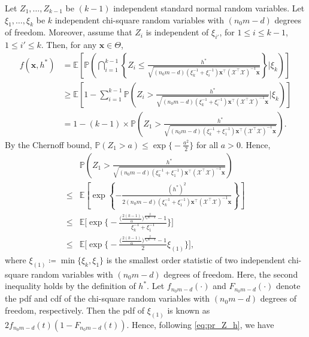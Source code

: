 \documentclass[ijoc,nonblindrev]{informs3}
\def\E{\mathbb{E}}
\def\pr{\mathbb{P}}
\def\bx{{\bm x}}
\def\cX{{\mathcal X}}
\begin{document}
Let $Z_1,\ldots,Z_{k-1}$ be $(k-1)$ independent standard normal random variables. Let $\xi_1,\ldots,\xi_k$ be $k$  independent chi-square random variables with $(n_0m-d)$ degrees of freedom.
Moreover, assume that $Z_i$ is independent of $\xi_{i'}$, for $1\leq i \leq k-1$, $1\leq i' \leq k$.
Then, for any $\bx\in\Theta$,
\begin{align}
f(\bx,h^*) &= \E \left[ \pr \left( \bigcap_{i=1}^{k-1} \left\{Z_i \leq \frac{h^*}{\sqrt{(n_0m-d) (\xi_k^{-1}+\xi_i^{-1})\bx^\intercal (\cX^\intercal \cX)^{-1} \bx}} \right\} \Bigg| \xi_k \right) \right] \nonumber\\
&\geq \E \left[ 1 - \sum_{i=1}^{k-1} \pr \left(Z_i > \frac{h^*}{\sqrt{(n_0m-d) (\xi_k^{-1}+\xi_i^{-1})\bx^\intercal (\cX^\intercal \cX)^{-1} \bx}} \Bigg| \xi_k \right) \right] \nonumber\\
&= 1 - (k-1) \times \pr \left(Z_1 > \frac{h^*}{\sqrt{(n_0m-d) (\xi_k^{-1}+\xi_1^{-1})\bx^\intercal (\cX^\intercal \cX)^{-1} \bx}} \right). \label{eq:f_x_h}
\end{align}
By the Chernoff bound, $\pr(Z_1>a)\leq \exp\big\{-\frac{a^2}{2}\big\}$ for all $a>0$.
Hence,
\begin{align}
&\pr \left(Z_1 > \frac{h^*}{\sqrt{(n_0m-d) (\xi_k^{-1}+\xi_1^{-1})\bx^\intercal (\cX^\intercal \cX)^{-1} \bx}} \right)\nonumber\\
\leq{}& \E \left[\exp\left\{-\frac{(h^*)^2}{2(n_0m-d) (\xi_k^{-1}+\xi_1^{-1})\bx^\intercal (\cX^\intercal \cX)^{-1} \bx}\right\} \right] \nonumber\\
\leq{}& \E \Bigg[\exp\Bigg\{-\frac{\big(\frac{2(k-1)}{\alpha}\big)^{\frac{2}{n_0m-d}}-1}{\xi_k^{-1}+\xi_1^{-1}}\Bigg\} \Bigg] \nonumber\\
\leq{}& \E \Bigg[\exp\Bigg\{-\frac{\big(\frac{2(k-1)}{\alpha}\big)^{\frac{2}{n_0m-d}}-1}{2} \xi_{(1)}\Bigg\} \Bigg] \label{eq:pr_Z_h},
\end{align}
where $\xi_{(1)} \coloneqq \min\{\xi_k,\xi_1\}$ is the smallest order statistic of two independent chi-square random variables with $(n_0m-d)$ degrees of freedom.
Here,
the second inequality holds by the definition of $h^*$.
Let $f_{n_0m-d}(\cdot)$ and $F_{n_0m-d}(\cdot)$ denote the pdf and cdf of the chi-square random variables with $(n_0m-d)$ degrees of freedom, respectively.
Then the pdf of $\xi_{(1)}$ is known as $2f_{n_0m-d}(t)(1-F_{n_0m-d}(t))$.
Hence, following \eqref{eq:pr_Z_h}, we have
\end{document}
